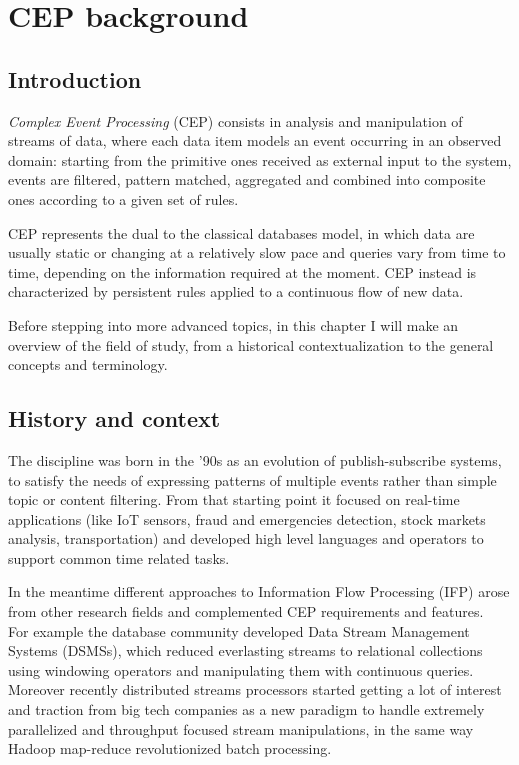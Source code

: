 \chapter{CEP background}

\section{Introduction}
\emph{Complex Event Processing} (CEP) consists in analysis and manipulation of streams of data, where each data item models an event occurring in an observed domain: starting from the primitive ones received as external input to the system, events are filtered, pattern matched, aggregated and combined into composite ones according to a given set of rules.

CEP represents the dual to the classical databases model, in which data are usually static or changing at a relatively slow pace and queries vary from time to time, depending on the information required at the moment. CEP instead is characterized by persistent rules applied to a continuous flow of new data.

Before stepping into more advanced topics, in this chapter I will make an overview of the field of study, from a historical contextualization to the general concepts and terminology.

\section{History and context}
The discipline was born in the '90s as an evolution of publish-subscribe systems, to satisfy the needs of expressing patterns of multiple events rather than simple topic or content filtering. From that starting point it focused on real-time applications (like IoT sensors, fraud and emergencies detection, stock markets analysis, transportation) and developed high level languages and operators to support common time related tasks.


In the meantime different approaches to Information Flow Processing (IFP) \cite{survey} arose from other research fields and complemented CEP requirements and features.\\
For example the database community developed Data Stream Management Systems (DSMSs), which reduced everlasting streams to relational collections using windowing operators and manipulating them with continuous queries.\\
Moreover recently distributed streams processors started getting a lot of interest and traction from big tech companies as a new paradigm to handle extremely parallelized and throughput focused stream manipulations, in the same way Hadoop map-reduce revolutionized batch processing.

